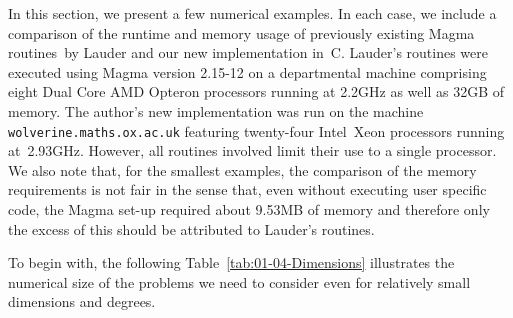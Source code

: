 In this section, we present a few numerical examples.  In each 
case, we include a comparison of the runtime and memory usage of 
previously existing {\sc Magma} routines\footnotemark\ by Lauder 
and our new implementation in~C.  Lauder's routines were executed 
using {\sc Magma} version {2.15-12} on a departmental machine 
comprising eight Dual Core AMD Opteron processors running at 2.2GHz 
as well as 32GB of memory.  The author's new implementation was 
run on the machine {\tt{wolverine.maths.ox.ac.uk}} featuring twenty-four 
\mbox{Intel Xeon} processors running at~2.93GHz.  However, all 
routines involved limit their use to a single processor.  We also note 
that, for the smallest examples, the comparison of the memory requirements 
is not fair in the sense that, even without executing user specific code, 
the {\sc Magma} set-up required about 9.53MB of memory and therefore 
only the excess of this should be attributed to Lauder's routines.


To begin with, the following Table~\ref{tab:01-04-Dimensions} illustrates the 
numerical size of the problems we need to consider even for relatively small 
dimensions and degrees.

